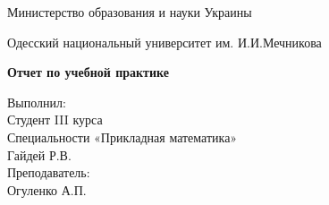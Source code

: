 \documentclass[12pt,a4paper]{scrartcl}
\begin{document}
\thispagestyle{empty}
\begin{center}
Министерство образования и науки Украины
\end{center}
\begin{center}
Одесский национальный университет им. И.И.Мечникова
\end{center}
\par\bigskip
\par\bigskip
\par\bigskip
\par\bigskip
\par\bigskip
\par\bigskip
\par\bigskip
\par\bigskip
\par\bigskip
\par\bigskip
\par\bigskip
\par\bigskip
\par\bigskip
\par\bigskip
\par\bigskip
\begin{center}
\Large\textbf{Отчет по учебной практике}
\end{center}
\par\bigskip
\par\bigskip
\par\bigskip
\par\bigskip
\par\bigskip
\par\bigskip
\par\bigskip
\par\bigskip
\begin{flushright}
Выполнил:\\
Студент III курса\\
Специальности «Прикладная математика»\\
Гайдей Р.В.\\
Преподаватель:\\
Огуленко А.П.
\end{flushright}
\par\bigskip
\par\bigskip
\par\bigskip
\par\bigskip
\par\bigskip
\par\bigskip
\par\bigskip
\par\bigskip
\par\bigskip
\end{document}
